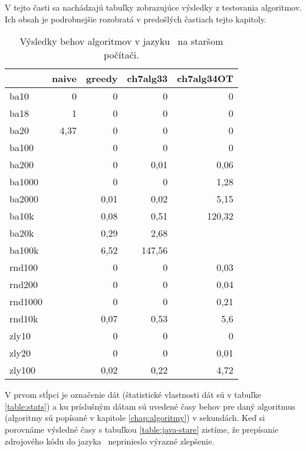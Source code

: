 V tejto časti sa nachádzajú tabuľky zobrazujúce výsledky z testovania 
algoritmov. Ich obsah je podrobnejšie rozobratá v predošlých častiach tejto 
kapitoly.

\begin{table}[h]
	\centering
	\caption{Výsledky behov algoritmov v jazyku \cpp\ na staršom počítači.}
	\begin{tabular}{l|rrrr}
		\hline
		& naive & greedy & ch7alg33 & ch7alg34OT \\ \hline
		ba10    & 0     & 0      & 0        & 0          \\
		ba18    & 1     & 0      & 0        & 0          \\
		ba20    & 4,37  & 0      & 0        & 0          \\
		ba100   &       & 0      & 0        & 0          \\
		ba200   &       & 0      & 0,01     & 0,06       \\
		ba1000  &       & 0      & 0        & 1,28       \\
		ba2000  &       & 0,01   & 0,02     & 5,15       \\
		ba10k   &       & 0,08   & 0,51     & 120,32     \\
		ba20k   &       & 0,29   & 2,68     &            \\
		ba100k  &       & 6,52   & 147,56   &            \\
		rnd100  &       & 0      & 0        & 0,03       \\
		rnd200  &       & 0      & 0        & 0,04       \\
		rnd1000 &       & 0      & 0        & 0,21       \\
		rnd10k  &       & 0,07   & 0,53     & 5,6        \\
		zly10   &       & 0      & 0        & 0          \\
		zly20   &       & 0      & 0        & 0,01       \\
		zly100  &       & 0,02   & 0,22     & 4,72       \\ \hline
	\end{tabular}
	\bigskip\par
	V prvom stĺpci je označenie dát (štatistické vlastnosti dát sú v tabuľke 
	\ref{table:stats}) a ku príslušným dátam sú uvedené časy behov pre daný 
	algoritmus (algoritmy sú popísané v kapitole \ref{chap:algoritmy}) v 
	sekundách. Keď si porovnáme výsledné časy s tabuľkou 
	\ref{table:java-stare} zistíme, že prepísanie zdrojového kódu do jazyka 
	\cpp\ neprinieslo výrazné zlepšenie.
	\label{table:cpp}
\end{table}

